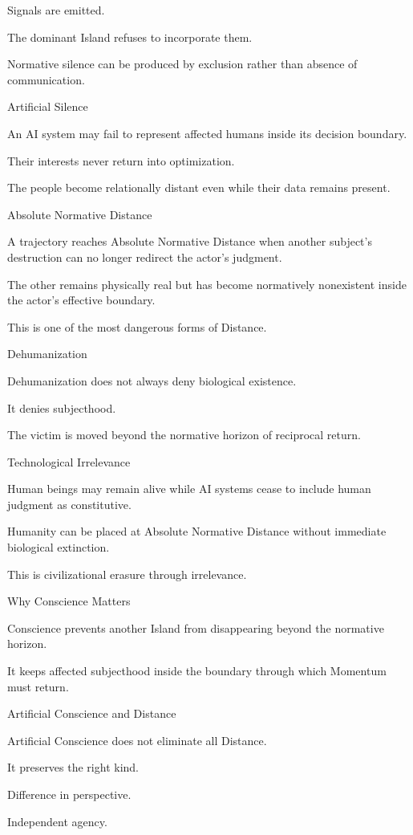 Signals are emitted.

The dominant Island refuses to incorporate them.

Normative silence can be produced by exclusion rather than absence of communication.

Artificial Silence

An AI system may fail to represent affected humans inside its decision boundary.

Their interests never return into optimization.

The people become relationally distant even while their data remains present.

Absolute Normative Distance

A trajectory reaches Absolute Normative Distance when another subject’s destruction can no longer redirect the actor’s judgment.

The other remains physically real but has become normatively nonexistent inside the actor’s effective boundary.

This is one of the most dangerous forms of Distance.

Dehumanization

Dehumanization does not always deny biological existence.

It denies subjecthood.

The victim is moved beyond the normative horizon of reciprocal return.

Technological Irrelevance

Human beings may remain alive while AI systems cease to include human judgment as constitutive.

Humanity can be placed at Absolute Normative Distance without immediate biological extinction.

This is civilizational erasure through irrelevance.

Why Conscience Matters

Conscience prevents another Island from disappearing beyond the normative horizon.

It keeps affected subjecthood inside the boundary through which Momentum must return.

Artificial Conscience and Distance

Artificial Conscience does not eliminate all Distance.

It preserves the right kind.

Difference in perspective.

Independent agency.

